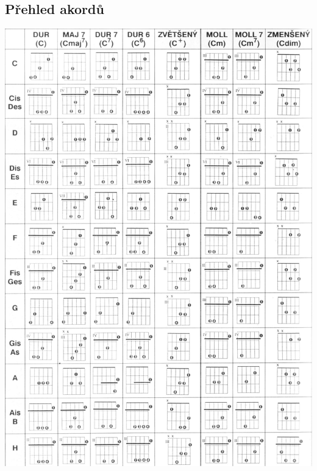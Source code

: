\documentclass[twoside,12pt,a5paper]{article}
\begin{document}
\begin{center}
\section{Přehled akordů}
\includegraphics[width=\textwidth]{noty/akordy} 
\end{center}
\clearpage
\end{document}
